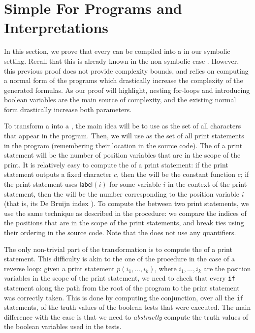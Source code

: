 \section{Simple For Programs and Interpretations}
\label{sec:low-level}

In this section, we prove that every  can be compiled
into a  in our symbolic setting. Recall that
this is already known in the non-symbolic case \cite{bojanczyk2018polyregular}.
However, this previous proof does not provide complexity bounds, and relies on
computing a normal form of the programs which drastically increase the
complexity of the generated formulas. As our proof will highlight, nesting
for-loops and introducing boolean variables are the main source of complexity,
and the existing normal form drastically increase both parameters.

To transform a  into a ,
the main idea will be to use as  the set of all
characters that appear in the program. Then, we will use as  the set of all print statements in the program (remembering their
location in the source code). The  of a print statement will be the
number of position variables that are in the scope of the print. It is
relatively easy to compute the  of a print statement: if
the print statement outputs a fixed character $c$, then the  will be the constant function $c$; if the print statement uses
$\mathsf{label}(i)$ for some variable $i$ in the context of the print
statement, then the  will be the number corresponding to
the position variable $i$ (that is, its De Bruijn index \cite{DEBRUJ72}). To
compute the  between two print statements, we use the same
technique as described in the  procedure: we compare the
indices of the positions that are in the scope of the print statements, and
break ties using their ordering in the source code. Note that the  does not use any quantifiers.

The only non-trivial part of the transformation is to compute the  of a print statement. This difficulty is akin to the one of the
 procedure in the case of a reverse loop: given a print
statement $p(i_1, \dots, i_k)$, where $i_1, \dots, i_k$ are the position
variables in the scope of the print statement, we need to check that every
\texttt{if} statement along the path from the root of the program to the print
statement was correctly taken. This is done by computing the conjunction, over
all the \texttt{if} statements, of the truth values of the boolean tests that
were executed. The main difference with the  case is
that we need to \emph{abstractly} compute the truth values of the boolean
variables used in the tests.

